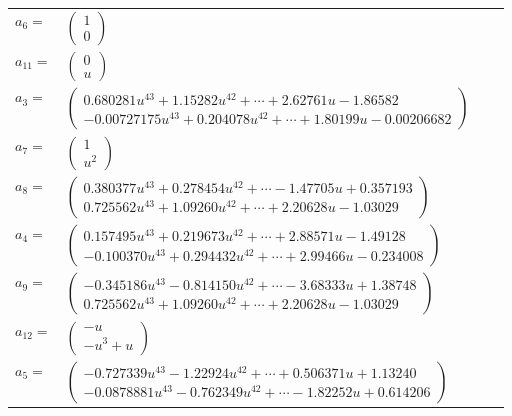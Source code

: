 \documentclass[1p]{elsarticle_modified}
\theoremstyle{definition}
\begin{document}
\begin{tabular}{m{7pt} m{180pt} m{7pt} m{180pt} }
\flushright $a_{6}=$&$\begin{pmatrix}1\\0\end{pmatrix}$ \\
\flushright $a_{11}=$&$\begin{pmatrix}0\\u\end{pmatrix}$ \\
\flushright $a_{3}=$&$\begin{pmatrix}0.680281 u^{43}+1.15282 u^{42}+\cdots+2.62761 u-1.86582\\-0.00727175 u^{43}+0.204078 u^{42}+\cdots+1.80199 u-0.00206682\end{pmatrix}$ \\
\flushright $a_{7}=$&$\begin{pmatrix}1\\u^2\end{pmatrix}$ \\
\flushright $a_{8}=$&$\begin{pmatrix}0.380377 u^{43}+0.278454 u^{42}+\cdots-1.47705 u+0.357193\\0.725562 u^{43}+1.09260 u^{42}+\cdots+2.20628 u-1.03029\end{pmatrix}$ \\
\flushright $a_{4}=$&$\begin{pmatrix}0.157495 u^{43}+0.219673 u^{42}+\cdots+2.88571 u-1.49128\\-0.100370 u^{43}+0.294432 u^{42}+\cdots+2.99466 u-0.234008\end{pmatrix}$ \\
\flushright $a_{9}=$&$\begin{pmatrix}-0.345186 u^{43}-0.814150 u^{42}+\cdots-3.68333 u+1.38748\\0.725562 u^{43}+1.09260 u^{42}+\cdots+2.20628 u-1.03029\end{pmatrix}$ \\
\flushright $a_{12}=$&$\begin{pmatrix}- u\\- u^3+u\end{pmatrix}$ \\
\flushright $a_{5}=$&$\begin{pmatrix}-0.727339 u^{43}-1.22924 u^{42}+\cdots+0.506371 u+1.13240\\-0.0878881 u^{43}-0.762349 u^{42}+\cdots-1.82252 u+0.614206\end{pmatrix}$ \\

\end{tabular}
\end{document}
